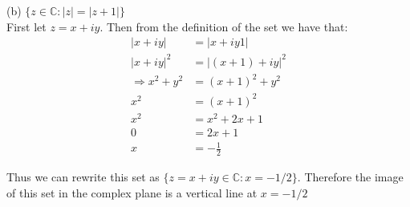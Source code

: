 \documentclass[a4paper, 11pt]{article}
\begin{document}
\pagebreak 

\noindent(b) $\{ z \in \mathbb{C}: |z|=|z+1| \}$ \\

First let $z=x+iy$. Then from the definition of the set we have that: 
	\begin{align*}
		|x+iy| &= |x+iy 1| \\ 
		|x+iy|^2 &= |(x+1)+iy|^2 \\ 
		\Rightarrow x^2 + y^2 &= (x+1)^2 + y^2 \\ 
		x^2 &= (x+1)^2 \\ 
		x^2 &= x^2 + 2x + 1 \\ 
		0 &= 2x + 1 \\ 
		x &= -\frac{1}{2} 
	\end{align*}


\noindent Thus we can rewrite this set as $\{z=x+iy \in \mathbb{C} : x = -1/2\}$. Therefore the image of this set in the complex plane is a vertical line at $x=-1/2$ 
\end{document}
